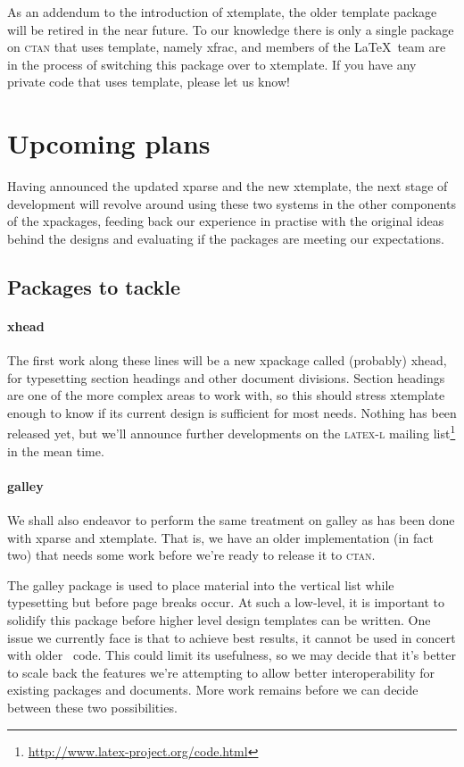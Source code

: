 \documentclass{ltnews}
\begin{document}
As an addendum to the introduction of \textsf{xtemplate}, the older \textsf{template} package will be retired in the near future. To our knowledge there is only a single package on \textsc{ctan} that uses \textsf{template}, namely \textsf{xfrac}, and members of the \LaTeX\ team are in the process of switching this package over to \textsf{xtemplate}. If you have any private code that uses \textsf{template}, please let us know!


\section{Upcoming plans}

Having announced the updated \textsf{xparse} and the new \textsf{xtemplate}, the next stage of development will revolve around using these two systems in the other components of the \textsf{xpackages}, feeding back our experience in practise with the original ideas behind the designs and evaluating if the packages are meeting our expectations.

\subsection{Packages to tackle}

\paragraph{\textsf{xhead}}
The first work along these lines will be a new \textsf{xpackage} called (probably) \textsf{xhead}, for typesetting section headings and other document divisions.
Section headings are one of the more complex areas to work with, so this should stress \textsf{xtemplate} enough to know if its current design is sufficient for most needs.
Nothing has been released yet, but we'll announce further developments on the \textsc{latex-l} mailing list\footnote{\url{http://www.latex-project.org/code.html}} in the mean time.

\paragraph{\textsf{galley}}
We shall also endeavor to perform the same treatment on \textsf{galley} as has
been done with \textsf{xparse} and \textsf{xtemplate}. That is, we have an
older implementation (in fact two) that needs some work before we're ready to release it to \textsc{ctan}.

The \textsf{galley} package is used to place material into the vertical list while typesetting but before page breaks occur. At such a low-level, it is important to solidify this package before higher level design templates can be written. One issue we currently face is that to achieve best results, it cannot be used in concert with older \LaTeXe\ code. This could limit its usefulness, so we may decide that it's better to scale back the features we're attempting to allow better interoperability for existing packages and documents. More work remains before we can decide between these two possibilities.
\end{document}
